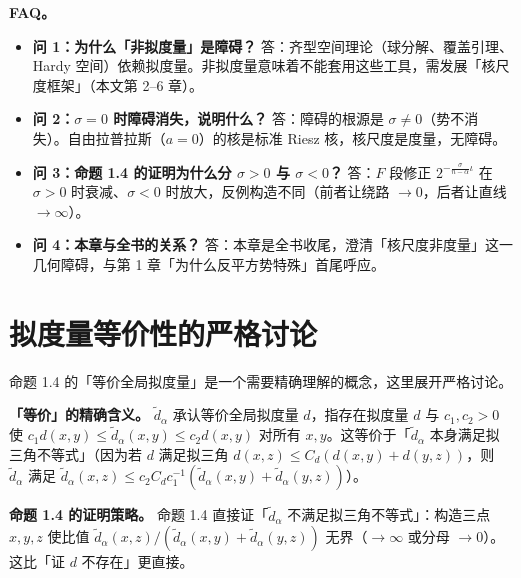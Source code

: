 \documentclass[a4paper,11pt,openany]{ctexbook}
\numberwithin{equation}{chapter}
\numberwithin{figure}{chapter}
\numberwithin{table}{chapter}
\begin{document}
\textbf{FAQ。}

\begin{itemize}
\item \textbf{问 1：为什么「非拟度量」是障碍？} 答：齐型空间理论（球分解、覆盖引理、Hardy 空间）依赖拟度量。非拟度量意味着不能套用这些工具，需发展「核尺度框架」（本文第 2–6 章）。
\end{itemize}

\begin{itemize}
\item \textbf{问 2：$\sigma=0$ 时障碍消失，说明什么？} 答：障碍的根源是 $\sigma\neq0$（势不消失）。自由拉普拉斯（$a=0$）的核是标准 Riesz 核，核尺度是度量，无障碍。
\end{itemize}

\begin{itemize}
\item \textbf{问 3：命题 1.4 的证明为什么分 $\sigma>0$ 与 $\sigma<0$？} 答：$F$ 段修正 $2^{-\frac{\sigma}{n-\alpha}\iota}$ 在 $\sigma>0$ 时衰减、$\sigma<0$ 时放大，反例构造不同（前者让绕路 $\to0$，后者让直线 $\to\infty$）。
\end{itemize}

\begin{itemize}
\item \textbf{问 4：本章与全书的关系？} 答：本章是全书收尾，澄清「核尺度非度量」这一几何障碍，与第 1 章「为什么反平方势特殊」首尾呼应。
\end{itemize}

\section{拟度量等价性的严格讨论}

命题 1.4 的「等价全局拟度量」是一个需要精确理解的概念，这里展开严格讨论。

\textbf{「等价」的精确含义。} $\widetilde d_\alpha$ 承认等价全局拟度量 $d$，指存在拟度量 $d$ 与 $c_1,c_2>0$ 使 $c_1d(x,y)\le\widetilde d_\alpha(x,y)\le c_2d(x,y)$ 对所有 $x,y$。这等价于「$\widetilde d_\alpha$ 本身满足拟三角不等式」（因为若 $d$ 满足拟三角 $d(x,z)\le C_d(d(x,y)+d(y,z))$，则 $\widetilde d_\alpha$ 满足 $\widetilde d_\alpha(x,z)\le c_2C_dc_1^{-1}(\widetilde d_\alpha(x,y)+\widetilde d_\alpha(y,z))$）。

\textbf{命题 1.4 的证明策略。} 命题 1.4 直接证「$\widetilde d_\alpha$ 不满足拟三角不等式」：构造三点 $x,y,z$ 使比值 $\widetilde d_\alpha(x,z)/(\widetilde d_\alpha(x,y)+\widetilde d_\alpha(y,z))$ 无界（$\to\infty$ 或分母 $\to0$）。这比「证 $d$ 不存在」更直接。
\end{document}
